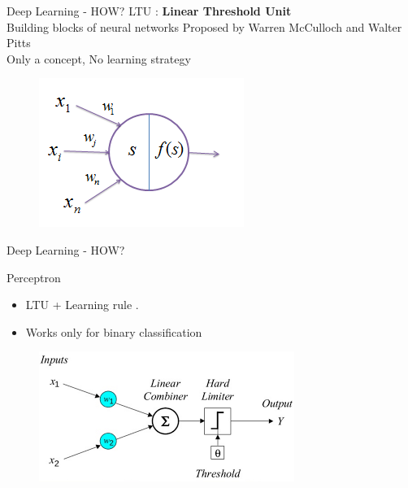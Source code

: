 \begin{frame}[fragile]{Deep Learning - HOW?}
LTU  : 
\textbf{Linear Threshold Unit}\\
Building blocks of neural networks
Proposed by Warren McCulloch and Walter Pitts\\
Only a concept, No learning strategy

    \begin{figure}[ht]
      \hspace*{-1cm}\includegraphics[width=0.5\linewidth]{ltu_image}
    \end{figure}
\end{frame}
\begin{frame}[fragile]{Deep Learning - HOW?}

Perceptron
    \begin{itemize}
        \item LTU + Learning rule .
\pause        
        \item Works only for binary classification
    \end{itemize}
    \begin{figure}[ht]
      \hspace*{-1cm}\includegraphics[width=0.5\linewidth]{ltu}
    \end{figure}
\end{frame}
